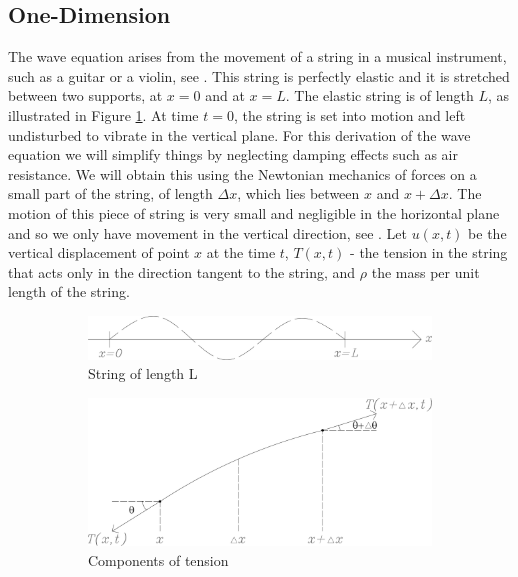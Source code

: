 \documentclass[a4paper, 12pt]{article}
\numberwithin{equation}{section}
\begin{document}
\subsection{One-Dimension}
The wave equation arises from the movement of a string in a musical instrument, such as a guitar or a violin, see
\cite{BoyDiP}. This string is perfectly elastic and
it is stretched between two supports, at $x=0$ and at $x=L$. The elastic string is of length $L$, as
illustrated in Figure \ref{fig:1a}. At time $t=0$, the string is set into motion and left undisturbed to vibrate in the
vertical plane. For this derivation of the wave equation we will simplify things by neglecting damping 
effects such as air resistance. We will obtain this using the Newtonian
mechanics of forces on a small part of the string, of length $\Delta x$, which lies between $x$ and 
$x+\Delta x$. The motion of this piece of string is very small and negligible in the horizontal plane
and so we only have movement
in the vertical direction, see \cite{Kr}. Let $u(x,t)$ be the vertical displacement of point $x$ at the time $t$, 
$T(x,t)$ - the tension in the string that acts only in the direction tangent to the string, and $\rho$ the 
mass per unit length of the string. 

\begin{figure}[h]
    \begin{subfigure}[t]{0.5\textwidth} 
        \includegraphics[width=0.9\linewidth]{images/grafic-1.png} 
        \caption{String of length L}
        \label{fig:1a}
    \end{subfigure}
    \begin{subfigure}[t]{0.5\textwidth}
        \includegraphics[width=0.9\linewidth]{images/grafic-2.png}
        \caption{Components of tension}
        \label{fig:1b}
    \end{subfigure}     
\caption{}
\label{fig:1}
\end{figure}
\end{document}
